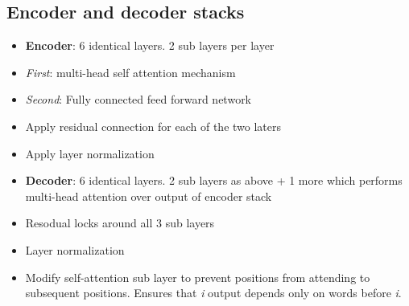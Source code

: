 \documentclass[a4paper]{article}
\begin{document}
\subsection{Encoder and decoder stacks}
\begin{itemize}
    \item \textbf{Encoder}: 6 identical layers. 2 sub layers per layer
    \item \textit{First}: multi-head self attention mechanism
    \item \textit{Second}: Fully connected feed forward network
    \item Apply residual connection for each of the two laters
    \item Apply layer normalization
    \item \textbf{Decoder}: 6 identical layers. 2 sub layers as above + 1 more which performs multi-head attention over output of encoder stack 
    \item Resodual locks around all 3 sub layers
    \item Layer normalization
    \item Modify self-attention sub layer to prevent positions from attending to subsequent positions. Ensures that \textit{i} output depends only on words before \textit{i}.
\end{itemize}
\end{document}
